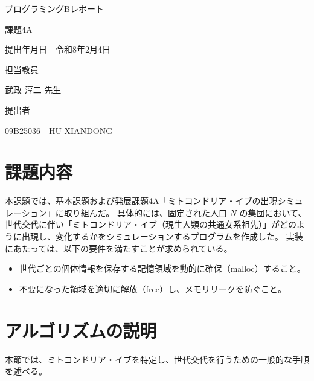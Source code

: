 \documentclass[a4paper,11pt]{jsarticle}
\begin{document}
\begin{titlepage}
    \centering
    \vspace*{3cm}
    {\LARGE プログラミングBレポート \par}
    \vspace{1cm}
    {\LARGE 課題4A \par}
    \vspace{3cm}
    
    {\large 提出年月日　令和8年2月4日 \par} 
    \vspace{3cm}
    
    {\large 担当教員 \par}
    \vspace{0.5cm}
    {\Large 武政 淳二 先生 \par}
    \vspace{3cm}
    
    {\large 提出者 \par}
    \vspace{0.5cm}
    {\Large 09B25036　HU XIANDONG \par}
    
    \vfill
\end{titlepage}


\section{課題内容}
% 
本課題では、基本課題および発展課題4A「ミトコンドリア・イブの出現シミュレーション」に取り組んだ。
具体的には、固定された人口 $N$ の集団において、世代交代に伴い「ミトコンドリア・イブ（現生人類の共通女系祖先）」がどのように出現し、変化するかをシミュレーションするプログラムを作成した。
実装にあたっては、以下の要件を満たすことが求められている。
\begin{itemize}
    \item 世代ごとの個体情報を保存する記憶領域を動的に確保（malloc）すること。
    \item 不要になった領域を適切に解放（free）し、メモリリークを防ぐこと。
\end{itemize}

\section{アルゴリズムの説明}
本節では、ミトコンドリア・イブを特定し、世代交代を行うための一般的な手順を述べる。
\end{document}
